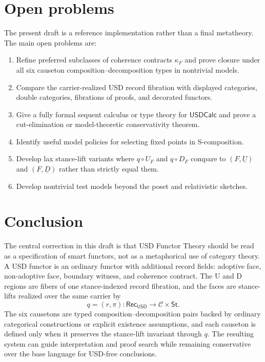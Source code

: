 \documentclass[11pt]{article}
\newcommand{\USD}{\mathsf{USD}}
\newcommand{\RecUSD}{\mathsf{Rec}_{\USD}}
\newcommand{\St}{\mathsf{St}}
\newcommand{\USDCalc}{\mathsf{USDCalc}}
\theoremstyle{definition}
\theoremstyle{plain}
\begin{document}
\section{Open problems}

The present draft is a reference implementation rather than a final
metatheory.  The main open problems are:
\begin{enumerate}[leftmargin=*]
  \item Refine preferred subclasses of coherence contracts $\kappa_F$ and
  prove closure under all six causeton composition--decomposition types in
  nontrivial models.
  \item Compare the carrier-realized USD record fibration with displayed categories,
  double categories, fibrations of proofs, and decorated functors.
  \item Give a fully formal sequent calculus or type theory for
  $\USDCalc$ and prove a cut-elimination or model-theoretic conservativity
  theorem.
  \item Identify useful model policies for selecting fixed points in
  S-composition.
  \item Develop lax stance-lift variants where $q\circ U_F$ and $q\circ D_F$ compare to
  $(F,\underline U)$ and $(F,\underline D)$ rather than strictly equal them.
  \item Develop nontrivial test models beyond the poset and relativistic
  sketches.
\end{enumerate}

\section{Conclusion}

The central correction in this draft is that USD Functor Theory should be
read as a specification of smart functors, not as a metaphorical use of
category theory.  A USD functor is an ordinary functor with additional
record fields: adoptive face, non-adoptive face, boundary witness, and
coherence contract.  The U and D regions are fibers of one stance-indexed
record fibration, and the faces are stance-lifts realized over the same
carrier by
\[
  q=(r,\pi):\RecUSD\to\mathcal C\times\St.
\]
The six causetons are typed composition--decomposition pairs backed by
ordinary categorical constructions or explicit existence assumptions, and
each causeton is defined only when it preserves the stance-lift invariant
through $q$.  The resulting system can guide interpretation and proof
search while remaining conservative over the base language for USD-free
conclusions.
\end{document}
